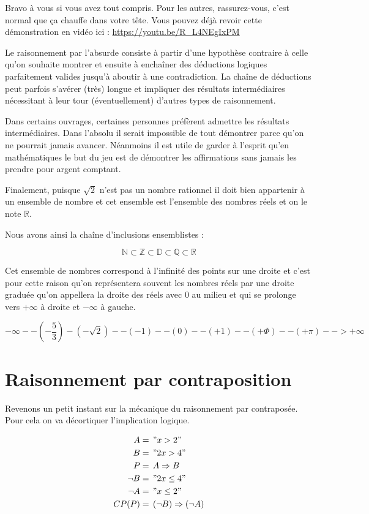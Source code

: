 \documentclass[a4paper, 11pt, twoside]{book}
\newcommand{\N}{\mathbb{N}}
\newcommand{\Z}{\mathbb{Z}}
\newcommand{\D}{\mathbb{D}}
\newcommand{\Q}{\mathbb{Q}}
\newcommand{\R}{\mathbb{R}}
\begin{document}
Bravo à vous si vous avez tout compris. Pour les autres,
rassurez-vous, c'est normal que ça chauffe dans votre tête. Vous
pouvez déjà revoir cette démonstration en vidéo ici :
\url{https://youtu.be/R\_L4NEgIxPM}

Le raisonnement par l'absurde consiste à partir d'une hypothèse
contraire à celle qu'on souhaite montrer et ensuite à enchaîner des
déductions logiques parfaitement valides jusqu'à aboutir à une
contradiction. La chaîne de déductions peut parfois s'avérer (très)
longue et impliquer des résultats intermédiaires nécessitant à leur
tour (éventuellement) d'autres types de raisonnement.

Dans certains ouvrages, certaines personnes préfèrent admettre les
résultats intermédiaires. Dans l'absolu il serait impossible de
tout démontrer parce qu'on ne pourrait jamais avancer. Néanmoins il
est utile de garder à l'esprit qu'en mathématiques le but du jeu
est de démontrer les affirmations sans jamais les prendre pour
argent comptant.

Finalement, puisque \(\sqrt{2}\) n'est pas un nombre rationnel il
doit bien appartenir à un ensemble de nombre et cet ensemble est
l'ensemble des nombres réels et on le note \(\R\).

Nous avons ainsi la chaîne d'inclusions ensemblistes :

\[\N\subset\Z\subset\D\subset\Q\subset\R\]

Cet ensemble de nombres correspond à l'infinité des points sur une
droite et c'est pour cette raison qu'on représentera souvent les
nombres réels par une droite graduée qu'on appellera la droite des
réels avec 0 au milieu et qui se prolonge vers \(+\infty\) à droite
et \(-\infty\) à gauche.

\[-\infty --\left(-\frac{5}{3}\right)-(-\sqrt{2})--(-1)--(0)--(+1)--(+\Phi)--(+\pi)-->+\infty\]

\section{Raisonnement par contraposition}
\label{sec:org298f45f}

Revenons un petit instant sur la mécanique du raisonnement par
contraposée. Pour cela on va décortiquer l'implication logique.

\begin{align*}
A &=\,"x > 2"\\
B &=\,"2x > 4"\\
P &=\,A\Rightarrow B\\
\neg B &=\, "2x \leq 4"\\
\neg A &=\, "x \leq 2"\\
CP(P) &=\,(\neg B)\Rightarrow(\neg A)
\end{align*}
\end{document}
